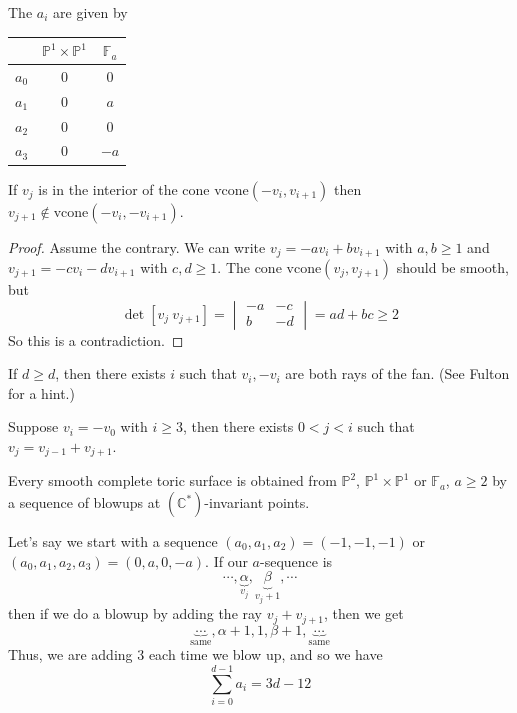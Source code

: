 \documentclass[a4paper,12pt]{amsart}
\newcommand{\CC}{\mathbb{C}}
\newcommand{\PP}{\mathbb{P}}
\begin{document}
The $a_i$ are given by
\begin{center}
	\begin{tabular}{c|c c} 
		& $\PP^1\times\PP^1$&$\mathbb{F}_a$\\
		\hline
		$a_0$ & 0 & 0\\ 
		$a_1$ & 0 & $a$\\ 
		$a_2$ & 0 & 0\\ 
		$a_3$ & 0 & $-a$\\ 
	\end{tabular}
\end{center}

\begin{Lemma}
	If $v_j$ is in the interior of the cone $\text{vcone}(-v_i,v_{i+1})$ then $v_{j+1}\not\in\text{vcone}(-v_i,-v_{i+1})$.
\end{Lemma}
\begin{proof}
	Assume the contrary. We can write $v_j=-av_i+bv_{i+1}$ with $a,b\geq 1$ and $v_{j+1}=-cv_i-dv_{i+1}$ with $c,d\geq 1$. The cone $\text{vcone}(v_j,v_{j+1})$ should be smooth, but
	$$\det[v_j\ v_{j+1}]=\begin{vmatrix}
	-a&-c\\b&-d
	\end{vmatrix}=ad+bc\geq 2$$
	So this is a contradiction.
\end{proof}

\begin{exercise}
	If $d\geq d$, then there exists $i$ such that $v_i,-v_i$ are both rays of the fan. (See Fulton for a hint.)
\end{exercise}

\begin{exercise}
	Suppose $v_i=-v_0$ with $i\geq 3$, then there exists $0<j<i$ such that $v_j=v_{j-1}+v_{j+1}$.
\end{exercise}

\begin{theorem}
	Every smooth complete toric surface is obtained from $\PP^2$, $\PP^1\times\PP^1$ or $\mathbb{F}_a$, $a\geq 2$ by a sequence of blowups at $(\CC^*)$-invariant points.
\end{theorem}

\begin{remark}
	Let's say we start with a sequence $(a_0,a_1,a_2)=(-1,-1,-1)$ or $(a_0,a_1,a_2,a_3)=(0,a,0,-a)$. If our $a$-sequence is
	$$\cdots,\underbrace{\alpha}_{v_j},\underbrace{\beta}_{v_j+1},\cdots$$
	then if we do a blowup by adding the ray $v_j+v_{j+1}$, then we get
	$$\underbrace{\cdots}_\text{same},\alpha+1,1,\beta+1,\underbrace{\cdots}_\text{same}$$
	Thus, we are adding 3 each time we blow up, and so we have
	$$\sum_{i=0}^{d-1}a_i=3d-12$$
\end{remark}
\end{document}

